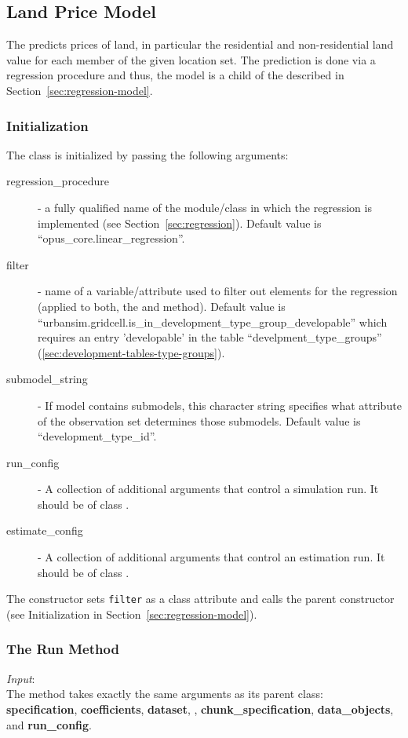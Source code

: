 \subsection{Land Price Model}
\label{sec:land-price-model} 
\modelsindex
%
The  \modelsindex predicts prices of land, in particular the
residential and non-residential land value for each member of the given
location set. The prediction is done via a regression procedure and thus,
the model \modelsindex is a child of the  \modelsindex described in
Section~\ref{sec:regression-model}.

\subsubsection{Initialization}
%
The class is initialized by passing the following arguments:
\begin{description}
\item[regression_procedure] - a fully qualified name of the module/class in
  which the regression is implemented (see
  Section~\ref{sec:regression}). Default value is
  ``opus_core.linear_regression''.
\item[filter] - name of a variable/attribute used to filter out elements for
  the regression (applied to both, the  and 
  method). Default value is
  ``urbansim.gridcell.is_in_development_type_group_developable'' which requires an entry 'developable'
  in the table ``develpment_type_groups'' (\ref{sec:development-tables-type-groups}).
\item[submodel_string] - If model \modelsindex contains submodels, this character string
  specifies what attribute of the observation set determines those
  submodels. Default value is ``development_type_id''.
\item[run_config] - A collection of additional arguments that control a
  simulation run. It should be of class .
\item[estimate_config] - A collection of additional arguments that control an
  estimation run. It should be of class .
\end{description}
The constructor sets \verb|filter| as a class attribute \attributesindex and calls the parent
constructor (see Initialization in Section~\ref{sec:regression-model}).

\subsubsection{The Run Method}
%
{\it Input}:\\[1mm]
The  method takes exactly the same arguments as its parent
class:\\
{\bf specification}, {\bf coefficients}, {\bf dataset}, , {\bf
  chunk_specification}, {\bf data_objects}, and {\bf run_config}.



